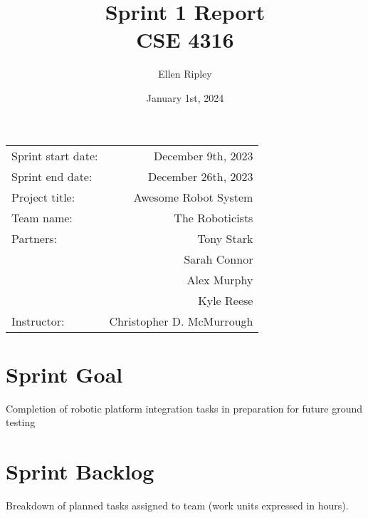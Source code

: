 \documentclass{article}
\title{Sprint 1 Report \\ CSE 4316}
\author{Ellen Ripley}
\date{January 1st, 2024}
\begin{document}
\maketitle
\begin{center}
\begin{tabular}{l r}

Sprint start date: & December 9th, 2023 \\

Sprint end date: & December 26th, 2023 \\

Project title: & Awesome Robot System \\

Team name: & The Roboticists \\

Partners: 	& Tony Stark \\
			& Sarah Connor \\
			& Alex Murphy \\
        	& Kyle Reese \\
Instructor: & Christopher D. McMurrough
\end{tabular}
\end{center}

\section{Sprint Goal}
Completion of robotic platform integration tasks in preparation for future ground testing

\section{Sprint Backlog}
Breakdown of planned tasks assigned to team (work units expressed in hours). \\ %
\end{document}
